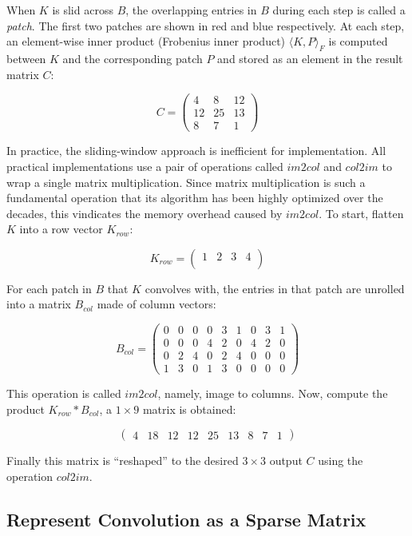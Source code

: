 When $K$ is slid across $B$, the overlapping entries in $B$ during each step is called a \textit{patch}.
The first two patches are shown in red and blue respectively. At each step, an element-wise inner product
(Frobenius inner product) $\langle K,P \rangle_{F}$ is computed between $K$ and the corresponding patch $P$
and stored as an element in the result matrix $C$:

$$
C =
  \begin{pmatrix}
    4 & 8 & 12 \\
    12 & 25 & 13 \\
    8 & 7 & 1
  \end{pmatrix}
$$

In practice, the sliding-window approach is inefficient for implementation. All practical implementations
use a pair of operations called $im2col$ and $col2im$ to wrap a single matrix multiplication. Since
matrix multiplication is such a fundamental operation that its algorithm has been highly optimized over the
decades, this vindicates the memory overhead caused by $im2col$. To start, flatten $K$ into a row vector
$K_{row}$:

$$
K_{row} =
  \begin{pmatrix}
    1 & 2 & 3 & 4 \\
  \end{pmatrix}
$$

For each patch in $B$ that $K$ convolves with, the entries in that patch are unrolled into a matrix $B_{col}$
made of column vectors:

$$
B_{col} =
  \begin{pmatrix}
    0 & 0 & 0 & 0 & 3 & 1 & 0 & 3 & 1 \\
    0 & 0 & 0 & 4 & 2 & 0 & 4 & 2 & 0 \\
    0 & 2 & 4 & 0 & 2 & 4 & 0 & 0 & 0 \\
    1 & 3 & 0 & 1 & 3 & 0 & 0 & 0 & 0
  \end{pmatrix}
$$

This operation is called $im2col$, namely, image to columns. Now, compute the product $K_{row} * B_{col}$,
a $1 \times 9$ matrix is obtained:

$$
\begin{pmatrix}
  4 & 18 & 12 & 12 & 25 & 13 & 8 & 7 & 1
\end{pmatrix}
$$

Finally this matrix is ``reshaped'' to the desired $3 \times 3$ output $C$ using the operation $col2im$.

\subsection{Represent Convolution as a Sparse Matrix}

